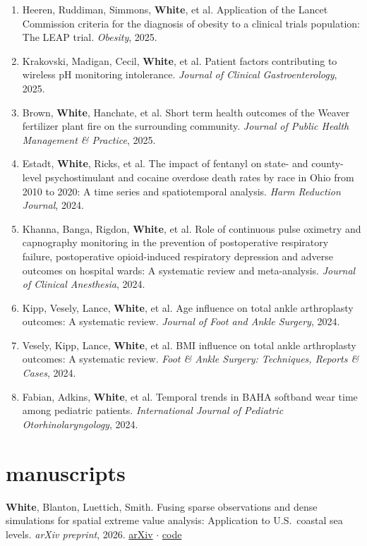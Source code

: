 \documentclass[11pt, letterpaper]{article}
\begin{document}
{\begin{enumerate}[leftmargin=1.5em, itemsep=1pt, parsep=0pt, topsep=0pt]
  \item Heeren, Ruddiman, Simmons, \textbf{White}, et al. Application of the Lancet Commission criteria for the diagnosis of obesity to a clinical trials population: The LEAP trial. \emph{Obesity}, 2025.
  \item Krakovski, Madigan, Cecil, \textbf{White}, et al. Patient factors contributing to wireless pH monitoring intolerance. \emph{Journal of Clinical Gastroenterology}, 2025.
  \item Brown, \textbf{White}, Hanchate, et al. Short term health outcomes of the Weaver fertilizer plant fire on the surrounding community. \emph{Journal of Public Health Management \& Practice}, 2025.
  \item Estadt, \textbf{White}, Ricks, et al. The impact of fentanyl on state- and county-level psychostimulant and cocaine overdose death rates by race in Ohio from 2010 to 2020: A time series and spatiotemporal analysis. \emph{Harm Reduction Journal}, 2024.
  \item Khanna, Banga, Rigdon, \textbf{White}, et al. Role of continuous pulse oximetry and capnography monitoring in the prevention of postoperative respiratory failure, postoperative opioid-induced respiratory depression and adverse outcomes on hospital wards: A systematic review and meta-analysis. \emph{Journal of Clinical Anesthesia}, 2024.
  \item Kipp, Vesely, Lance, \textbf{White}, et al. Age influence on total ankle arthroplasty outcomes: A systematic review. \emph{Journal of Foot and Ankle Surgery}, 2024.
  \item Vesely, Kipp, Lance, \textbf{White}, et al. BMI influence on total ankle arthroplasty outcomes: A systematic review. \emph{Foot \& Ankle Surgery: Techniques, Reports \& Cases}, 2024.
  \item Fabian, Adkins, \textbf{White}, et al. Temporal trends in BAHA softband wear time among pediatric patients. \emph{International Journal of Pediatric Otorhinolaryngology}, 2024.
\end{enumerate}
}

\section{manuscripts}

{\footnotesize
\textbf{White}, Blanton, Luettich, Smith. Fusing sparse observations and dense simulations for spatial extreme value analysis: Application to U.S.\ coastal sea levels. \emph{arXiv preprint}, 2026. \href{https://arxiv.org/abs/2603.03247}{arXiv} $\cdot$ \href{https://github.com/BrianNathanWhite/evfuse}{code}
}
\end{document}
